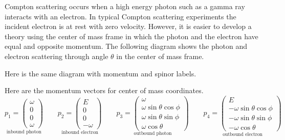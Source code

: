 \documentclass[12pt]{article}
\begin{document}
\noindent
Compton scattering occurs when a high energy photon such as a gamma ray interacts with an electron.
In typical Compton scattering experiments the incident electron is at rest with zero velocity.
However, it is easier to develop a theory using the center of mass frame in which
the photon and the electron have equal and opposite momentum.
The following diagram shows the photon and electron scattering through angle $\theta$
in the center of mass frame.
\begin{center}
\end{center}

\noindent
Here is the same diagram with momentum and spinor labels.
\begin{center}
\end{center}

\noindent
Here are the momentum vectors for center of mass coordinates.
\begin{equation*}
\underset{\text{inbound photon}}
{
p_1=\begin{pmatrix}\omega\\0\\0\\ \omega\end{pmatrix}
}
\qquad
\underset{\text{inbound electron}}
{
p_2=\begin{pmatrix}E\\0\\0\\-\omega\end{pmatrix}
}
\qquad
\underset{\text{outbound photon}}
{
p_3=\begin{pmatrix}
\omega\\
\omega\sin\theta\cos\phi\\
\omega\sin\theta\sin\phi\\
\omega\cos\theta
\end{pmatrix}
}
\qquad
\underset{\text{outbound electron}}
{
p_4=\begin{pmatrix}
E\\
-\omega\sin\theta\cos\phi\\
-\omega\sin\theta\sin\phi\\
-\omega\cos\theta
\end{pmatrix}
}
\end{equation*}
\end{document}
